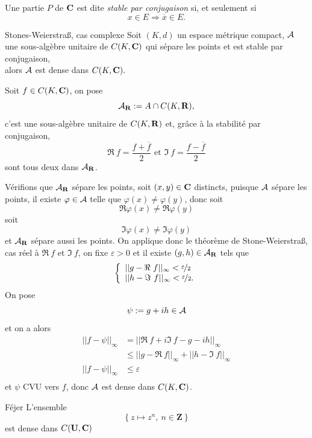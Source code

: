 \documentclass[a4paper,11pt, twoside]{article}
\begin{document}
\begin{Def}
  Une partie $P$ de $\mathbf C$ est dite \emph{stable par conjugaison} si, et seulement si
  $$ x\in E\Rightarrow \overline x\in E.$$
\end{Def}

\begin{thC}{Stones-Weierstra\ss, cas complexe}
  Soit $(K,d)$ un espace métrique compact, $\mathcal A$ une sous-algèbre unitaire de $C(K,\mathbf C)$ qui sépare les points et est stable par conjugaison,\\

  alors $\mathcal A$ est dense dans $C(K,\mathbf C).$
\end{thC}

\begin{Proof}
  Soit $f\in C(K,\mathbf C)$, on pose 
  $$\mathcal A_{\mathbf R}:=A\cap C(K,\mathbf R),$$
  c'est une sous-algèbre unitaire de $C(K,\mathbf R)$ et, grâce à la stabilité par conjugaison, 
  $$\Re\ f=\frac{f+\overline f}2\text{ et }\Im\ f=\frac{f-\overline f}2$$
  sont tous deux dans $\mathcal A_{\mathbf R}$.

  Vérifions que $\mathcal A_{\mathbf R}$ sépare les points, soit $(x,y)\in \mathbf C$ distincts, puisque $\mathcal A$ sépare les points, il existe $\varphi\in \mathcal A$ telle que $\varphi(x)\neq \varphi(y)$, donc soit
  $$\Re \varphi(x)\neq \Re \varphi(y)$$
  soit 
  $$\Im \varphi(x)\neq \Im \varphi(y)$$
  et $\mathcal A_{\mathbf R}$ sépare aussi les points.
  On applique donc le théorème de Stone-Weierstra\ss, cas réel à $\Re\ f$ et $\Im\ f$, on fixe $\varepsilon>0$ et il existe $(g,h)\in \mathcal A_{\mathbf R}$ tels que 
  $$\left\{\begin{array}{l}
    ||g-\Re\ f||_{\infty}<\nicefrac{\varepsilon}{2}\\
    ||h-\Im\ f||_{\infty}<\nicefrac{\varepsilon}{2}.
  \end{array}\right.$$
  On pose $$\psi:=g+ih\in \mathcal A$$
  et on a alors
  \begin{align*}
    ||f-\psi||_{\infty}&=||\Re\ f+i\Im\ f-g-ih||_{\infty}\\
    &\leqslant ||g-\Re\ f||_{\infty}+||h-\Im\ f||_{\infty}\\
    ||f-\psi||_{\infty}&\leqslant \varepsilon\\
  \end{align*}
  et $\psi$ CVU vers $f$, donc $\mathcal A$ est dense dans $C(K,\mathbf C)$.
\end{Proof}


\begin{corollaireC}{Féjer}
  L'ensemble
  $$\left\{z\longmapsto z ^n,\ n\in\mathbf Z\right\}$$
  est dense dans $C(\mathbf U,\mathbf C)$
\end{corollaireC}
\end{document}
